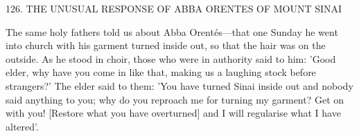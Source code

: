 126.
THE UNUSUAL RESPONSE OF ABBA ORENTES
OF MOUNT SINAI

The same holy fathers told us about Abba Orentés—that one
Sunday he went into church with his garment turned inside out, so
that the hair was on the outside.
As he stood in choir, those who
were in authority said to him: 'Good elder, why have you come in
like that, making us a laughing stock before strangers?' The elder
said to them: 'You have turned Sinai inside out and nobody said
anything to you; why do you reproach me for turning my garment?
Get on with you! [Restore what you have overturned] and I will
regularise what I have altered'.

